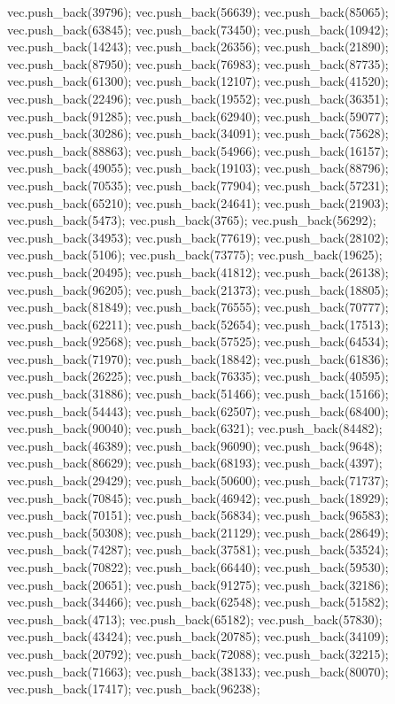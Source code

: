 vec.push_back(39796);
vec.push_back(56639);
vec.push_back(85065);
vec.push_back(63845);
vec.push_back(73450);
vec.push_back(10942);
vec.push_back(14243);
vec.push_back(26356);
vec.push_back(21890);
vec.push_back(87950);
vec.push_back(76983);
vec.push_back(87735);
vec.push_back(61300);
vec.push_back(12107);
vec.push_back(41520);
vec.push_back(22496);
vec.push_back(19552);
vec.push_back(36351);
vec.push_back(91285);
vec.push_back(62940);
vec.push_back(59077);
vec.push_back(30286);
vec.push_back(34091);
vec.push_back(75628);
vec.push_back(88863);
vec.push_back(54966);
vec.push_back(16157);
vec.push_back(49055);
vec.push_back(19103);
vec.push_back(88796);
vec.push_back(70535);
vec.push_back(77904);
vec.push_back(57231);
vec.push_back(65210);
vec.push_back(24641);
vec.push_back(21903);
vec.push_back(5473);
vec.push_back(3765);
vec.push_back(56292);
vec.push_back(34953);
vec.push_back(77619);
vec.push_back(28102);
vec.push_back(5106);
vec.push_back(73775);
vec.push_back(19625);
vec.push_back(20495);
vec.push_back(41812);
vec.push_back(26138);
vec.push_back(96205);
vec.push_back(21373);
vec.push_back(18805);
vec.push_back(81849);
vec.push_back(76555);
vec.push_back(70777);
vec.push_back(62211);
vec.push_back(52654);
vec.push_back(17513);
vec.push_back(92568);
vec.push_back(57525);
vec.push_back(64534);
vec.push_back(71970);
vec.push_back(18842);
vec.push_back(61836);
vec.push_back(26225);
vec.push_back(76335);
vec.push_back(40595);
vec.push_back(31886);
vec.push_back(51466);
vec.push_back(15166);
vec.push_back(54443);
vec.push_back(62507);
vec.push_back(68400);
vec.push_back(90040);
vec.push_back(6321);
vec.push_back(84482);
vec.push_back(46389);
vec.push_back(96090);
vec.push_back(9648);
vec.push_back(86629);
vec.push_back(68193);
vec.push_back(4397);
vec.push_back(29429);
vec.push_back(50600);
vec.push_back(71737);
vec.push_back(70845);
vec.push_back(46942);
vec.push_back(18929);
vec.push_back(70151);
vec.push_back(56834);
vec.push_back(96583);
vec.push_back(50308);
vec.push_back(21129);
vec.push_back(28649);
vec.push_back(74287);
vec.push_back(37581);
vec.push_back(53524);
vec.push_back(70822);
vec.push_back(66440);
vec.push_back(59530);
vec.push_back(20651);
vec.push_back(91275);
vec.push_back(32186);
vec.push_back(34466);
vec.push_back(62548);
vec.push_back(51582);
vec.push_back(4713);
vec.push_back(65182);
vec.push_back(57830);
vec.push_back(43424);
vec.push_back(20785);
vec.push_back(34109);
vec.push_back(20792);
vec.push_back(72088);
vec.push_back(32215);
vec.push_back(71663);
vec.push_back(38133);
vec.push_back(80070);
vec.push_back(17417);
vec.push_back(96238);
